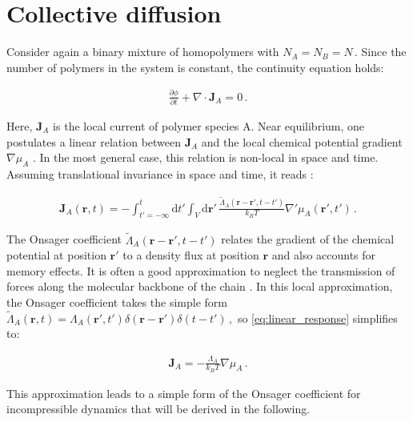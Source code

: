 \documentclass[bachelor,       %
               oneside,        %
               BCOR10mm,       %
               ngerman, english %
               ]{GAUBM}
\begin{document}
\section{Collective diffusion}

Consider again a binary mixture of homopolymers with $N_A=N_B=N\,$. Since the number of polymers in the system is constant, the continuity equation holds:

\begin{align}
  \frac{\partial\phi}{\partial t}+\nabla\cdot\mathbf{J}_A=0\,.
  \label{eq:conti}
\end{align}

Here, $\mathbf{J}_A$ is the local current of polymer species A. Near equilibrium, one postulates a linear relation between $\mathbf{J}_A$ and the local chemical potential gradient $\nabla\mu_A$ \cite{deGennes80}. In the most general case, this relation is non-local in space and time. Assuming translational invariance in space and time, it reads \cite{erukhimovich1986nonexponential}:


\begin{align}
    \mathbf{J}_A(\mathbf{r},t)=-\int_{t'=-\infty}^t\mathrm d t'\int_V\mathrm d \mathbf{r'}\,\frac{\tilde\Lambda_A(\mathbf{r}- \mathbf{r'},t-t')}{k_BT}\nabla '\mu_A(\mathbf{r'},t')\,.
    \label{eq:linear_response}
\end{align}

The Onsager coefficient $\tilde\Lambda_A(\mathbf{r}- \mathbf{r'},t-t')$ relates the gradient of the chemical potential at position $\mathbf{r'}$ to a density flux at position $\mathbf r$ and also accounts for memory effects. It is often a good approximation to neglect the transmission of forces along the molecular backbone of the chain \cite{COOK1970297}. In this local approximation, the Onsager coefficient takes the simple form $\tilde\Lambda_A(\mathbf r,t)=\Lambda_A(\mathbf{r'},t')\delta(\mathbf r-\mathbf r')\delta(t-t')\,,$ so \autoref{eq:linear_response} simplifies to: 



\begin{align}
    \mathbf {J}_A=-\frac{\Lambda_A}{k_BT}\nabla\mu_A\,.
    \label{eq:current_local}
\end{align}


This approximation leads to a simple form of the Onsager coefficient for incompressible dynamics that will be derived in the following. 


\end{document}
